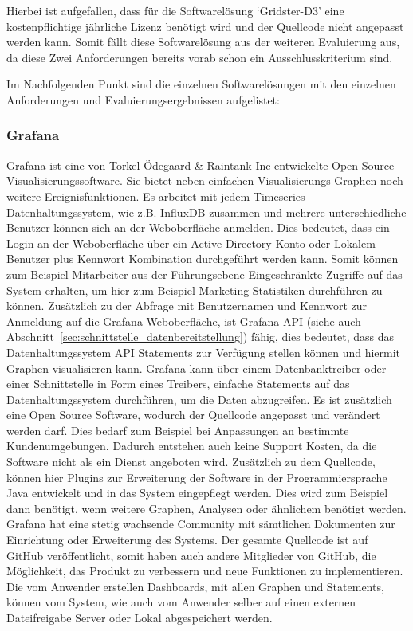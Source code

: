 Hierbei ist aufgefallen, dass für die Softwarelösung `Gridster-D3' eine
kostenpflichtige jährliche Lizenz benötigt wird und der Quellcode nicht
angepasst werden kann. Somit fällt diese Softwarelösung aus der weiteren
Evaluierung aus, da diese Zwei Anforderungen bereits vorab schon ein
Ausschlusskriterium sind.

Im Nachfolgenden Punkt sind die einzelnen Softwarelösungen mit den einzelnen
Anforderungen und Evaluierungsergebnissen aufgelistet:
\mr%

\subsubsection{Grafana}
\label{subsubsec:grafana}
Grafana ist eine von Torkel Ödegaard \& Raintank Inc entwickelte Open Source
Visualisierungssoftware. Sie bietet neben einfachen Visualisierungs Graphen
noch weitere Ereignisfunktionen. Es arbeitet mit jedem Timeseries
Datenhaltungssystem, wie z.B. InfluxDB zusammen und mehrere unterschiedliche
Benutzer können sich an der Weboberfläche anmelden. Dies bedeutet, dass ein
Login an der Weboberfläche über ein \gls{Active Directory} Konto oder Lokalem
Benutzer plus Kennwort Kombination durchgeführt werden kann. Somit können zum
Beispiel Mitarbeiter aus der Führungsebene Eingeschränkte Zugriffe auf das
System erhalten, um hier zum Beispiel Marketing Statistiken durchführen zu
können. Zusätzlich zu der Abfrage mit Benutzernamen und Kennwort zur Anmeldung
auf die Grafana Weboberfläche, ist Grafana API (siehe auch
Abschnitt~\ref{sec:schnittstelle_datenbereitstellung}) fähig, dies bedeutet,
dass das Datenhaltungssystem API Statements zur Verfügung stellen können und
hiermit Graphen visualisieren kann. Grafana kann über einem
\gls{Datenbanktreiber} oder einer Schnittstelle in Form eines Treibers,
einfache Statements auf das Datenhaltungssystem durchführen, um die Daten
abzugreifen. Es ist zusätzlich eine Open Source Software, wodurch der Quellcode
angepasst und verändert werden darf. Dies bedarf zum Beispiel bei Anpassungen
an bestimmte Kundenumgebungen. Dadurch entstehen auch keine Support Kosten, da
die Software nicht als ein Dienst angeboten wird. Zusätzlich zu dem Quellcode,
können hier Plugins zur Erweiterung der Software in der Programmiersprache Java
entwickelt und in das System eingepflegt werden. Dies wird zum Beispiel dann
benötigt, wenn weitere Graphen, Analysen oder ähnlichem benötigt werden.
Grafana hat eine stetig wachsende Community mit sämtlichen Dokumenten zur
Einrichtung oder Erweiterung des Systems. Der gesamte Quellcode ist auf GitHub
veröffentlicht, somit haben auch andere Mitglieder von GitHub, die Möglichkeit,
das Produkt zu verbessern und neue Funktionen zu implementieren. Die vom
Anwender erstellen Dashboards, mit allen Graphen und Statements, können vom
System, wie auch vom Anwender selber auf einen externen Dateifreigabe Server
oder Lokal abgespeichert werden.


